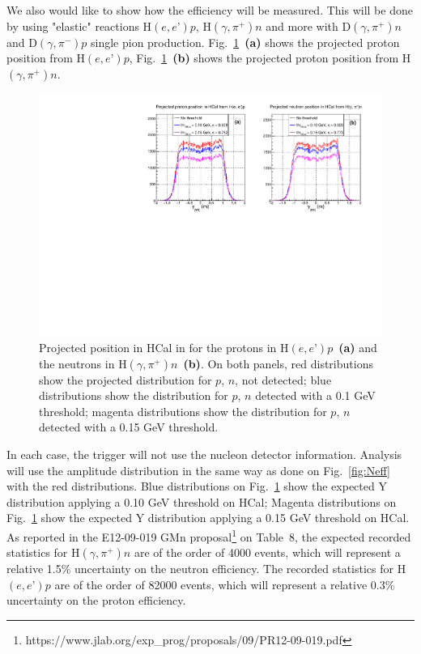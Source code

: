\documentclass[11pt]{article}
\begin{document}
We also would like to show how the efficiency will be measured.
This will be done by using "elastic" reactions H$(e,e’)p$, H$(\gamma,\pi^+)n$
and more with D$(\gamma,\pi^+)n$ and D$(\gamma,\pi^-)p$ single pion production.
Fig.~\ref{fig:Nproj}~{\bf(a)} shows the projected proton position from H$(e,e’)p$, 
Fig.~\ref{fig:Nproj}~{\bf(b)} shows the projected proton position from H$(\gamma,\pi^+)n$.
%
\begin{figure}[!h]
  \centering
  \includegraphics[width=12cm]{ProtVsNeut_CalibYproj.pdf}
  \caption{Projected position in HCal in for the protons in H$(e,e’)p$~{\bf(a)} and the neutrons in H$(\gamma,\pi^+)n$~{\bf(b)}. On both panels, red distributions show the projected distribution for $p$, $n$, not detected; blue distributions show the distribution for $p$, $n$ detected with a 0.1 GeV threshold; magenta distributions show the distribution for $p$, $n$ detected with a 0.15 GeV threshold.}
  \label{fig:Nproj}
\end{figure}
%
In each case, the trigger will not use the nucleon detector information.
Analysis will use the amplitude distribution in the same way as done on  Fig.~\ref{fig:Neff} with the red distributions.
Blue distributions on Fig.~\ref{fig:Nproj} show the expected Y distribution applying a 0.10 GeV threshold on HCal;
Magenta distributions on Fig.~\ref{fig:Nproj} show the expected Y distribution applying a 0.15 GeV threshold on HCal.
As reported in the E12-09-019 GMn proposal\footnote{https://www.jlab.org/exp\_prog/proposals/09/PR12-09-019.pdf} on Table~8, the expected recorded statistics for H$(\gamma,\pi^+)n$ are of the order of 4000 events, which will represent a relative 1.5\% uncertainty on the neutron efficiency. The recorded statistics for H$(e,e’)p$ are of the order of 82000 events, which will represent a relative 0.3\% uncertainty on the proton efficiency.\\

\end{document}
